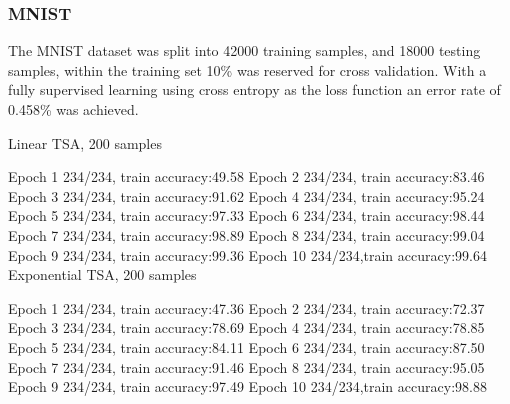 \documentclass[a4paper]{article}
\begin{document}
\subsubsection{MNIST}
The MNIST dataset was split into 42000 training samples, and 18000 testing samples, within the training set 10\% was reserved for cross validation. With a fully supervised learning using cross entropy as the loss function an error rate of 0.458\% was achieved. 


Linear TSA, 200 samples 

Epoch 1 234/234, train accuracy:49.58%
Epoch 2 234/234, train accuracy:83.46%
Epoch 3 234/234, train accuracy:91.62%
Epoch 4 234/234, train accuracy:95.24%
Epoch 5 234/234, train accuracy:97.33%
Epoch 6 234/234, train accuracy:98.44%
Epoch 7 234/234, train accuracy:98.89%
Epoch 8 234/234, train accuracy:99.04%
Epoch 9 234/234, train accuracy:99.36%
Epoch 10 234/234,train accuracy:99.64%
Exponential TSA, 200 samples

Epoch 1 234/234, train accuracy:47.36%
Epoch 2 234/234, train accuracy:72.37%
Epoch 3 234/234, train accuracy:78.69%
Epoch 4 234/234, train accuracy:78.85%
Epoch 5 234/234, train accuracy:84.11%
Epoch 6 234/234, train accuracy:87.50%
Epoch 7 234/234, train accuracy:91.46%
Epoch 8 234/234, train accuracy:95.05%
Epoch 9 234/234, train accuracy:97.49%
Epoch 10 234/234,train accuracy:98.88%
 
\end{document}
